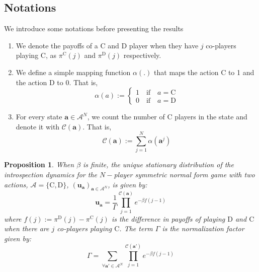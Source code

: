 \documentclass[11pt]{article}
\theoremstyle{plainCl1}
\newtheorem{Prop}{Proposition}
\theoremstyle{plainCl2}
\newcommand{\abf}{\mathbf{a}}
\newcommand{\ubf}{\mathbf{u}}
\newcommand{\C}{\mathrm{C}}
\newcommand{\D}{\mathrm{D}}
\begin{document}
\subsection*{Notations}
We introduce some notations before presenting the results
\begin{enumerate}

\item We denote the payoffs of a $\C$ and $\D$ player when they have $j$ co-players playing $\C$, as $\pi^{\C}(j)$ and $\pi^{\D}(j)$ respectively. 
\item We define a simple mapping function $\alpha(.)$ that maps the action $\C$ to 1 and the action $\D$ to $0$. That is, 
\begin{equation}
\alpha(a):= 
\begin{cases}
1 \quad \text{if} \quad a = \C \\
0 \quad \text{if} \quad a = \D  
\end{cases}
\end{equation}
\item For every state $\abf \in \mathcal{A}^N$, we count the number of $\C$ players in the state and denote it with $\mathcal{C}(\abf)$. That is, 
\begin{equation}
\mathcal{C}(\abf) := \sum_{j=1}^N \alpha(\abf^j)
\end{equation}
\end{enumerate}
\newpage
\begin{Prop}
\label{Prop:Symmetric-2-strategies-state}
When $\beta$ is finite, the unique stationary distribution of the introspection dynamics for the $N-$player symmetric normal form game with two actions, $\mathcal{A} = \{\C, \D \}$, $(\ubf_{\abf})_{\abf \in \mathcal{A}^N}$, is given by:
\begin{equation}
\label{Eq:stationary-dist-symm-2-stgs-state}
\ubf_\abf = \frac{1}{\Gamma} \displaystyle \prod_{j=1}^{\mathcal{C}(\abf)} \displaystyle e^{-\beta f(j-1)}
\end{equation}
where $f(j) := \pi^\D(j) - \pi^\C(j)$ is the difference in payoffs of playing $\D$ and $\C$ when there are $j$ co-players playing $\C$. The term $\Gamma$ is the normalization factor given by:
\begin{equation}
\label{Eq:stationary-dist-normalization-symm-2-stgs-state}
\Gamma = \displaystyle \sum_{\forall \abf' \in \mathcal{A}^N} \prod_{j = 1}^{\mathcal{C}(\abf')} \displaystyle e^{-\beta f(j-1)}
\end{equation}
\end{Prop}
\end{document}
